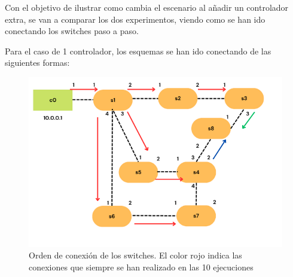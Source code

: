 \documentclass[a4paper, 12pt]{book}
\begin{document}
 	
 	\begin{figure}[H]
 		\centering
 		
 		\hfill
 		\hfill
 	\end{figure}
 	
 	Con el objetivo de ilustrar como cambia el escenario al añadir un controlador extra, se van a comparar los dos experimentos, viendo como se han ido conectando los switches paso a paso.
 	
 	Para el caso de 1 controlador, los esquemas se han ido conectando de las siguientes formas:
 	
 	\begin{figure}[H]
 		\centering
 		\includegraphics[width=12cm, keepaspectratio]{img/rutasEscenario1-1c}
 		\caption{Orden de conexión de los switches. El color rojo indica las conexiones que siempre se han realizado en las 10 ejecuciones}
 		\label{figura:escenario1_1c_1}
 	\end{figure}
 	
\end{document}
